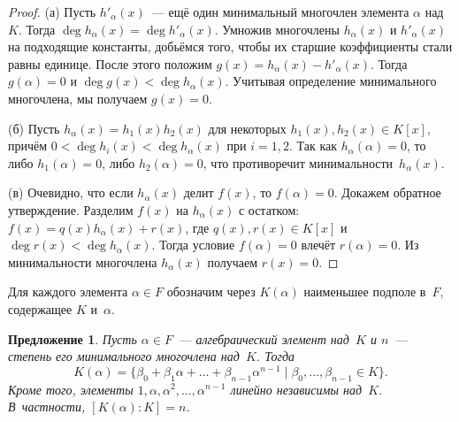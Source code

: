 \documentclass[a4paper,10pt]{amsart}
\newtheorem{proposition}{Предложение}
\theoremstyle{definition}
\theoremstyle{remark}
\begin{document}
\begin{proof}
	(а) Пусть $h'_\alpha(x)$~--- ещё один минимальный многочлен элемента
	$\alpha$ над~$K$. Тогда $\deg h_\alpha(x) = \deg h'_\alpha(x)$.
	Умножив многочлены $h_\alpha(x)$ и $h'_\alpha(x)$ на подходящие
	константы, добьёмся того, чтобы их старшие коэффициенты стали равны
	единице. После этого положим $g(x) = h_\alpha(x) - h'_\alpha(x)$.
	Тогда $g(\alpha) = 0$ и $\deg g(x) < \deg h_\alpha(x)$. Учитывая
	определение минимального многочлена, мы получаем $g(x) = 0$.
	
	(б) Пусть $h_\alpha(x) = h_1(x) h_2(x)$ для некоторых $h_1(x),
	h_2(x) \in K[x]$, причём $0 < \deg h_i(x) < \deg h_\alpha(x)$ при $i
	= 1,2$. Так как $h_\alpha(\alpha) = 0$, то либо $h_1(\alpha)=0$,
	либо $h_2(\alpha)=0$, что противоречит минимальности~$h_\alpha(x)$.
	
	(в) Очевидно, что если $h_\alpha(x)$ делит $f(x)$, то $f(\alpha) =
	0$. Докажем обратное утверждение. Разделим $f(x)$ на $h_\alpha(x)$ с
	остатком: $f(x) = q(x)h_\alpha(x) + r(x)$, где $q(x), r(x) \in K[x]$
	и $\deg r(x) < \deg h_\alpha(x)$. Тогда условие $f(\alpha)=0$ влечёт
	$r(\alpha) = 0$. Из минимальности многочлена $h_\alpha(x)$ получаем
	$r(x)=0$.
\end{proof}

Для каждого элемента $\alpha \in F$ обозначим через $K(\alpha)$
наименьшее подполе в~$F$, содержащее $K$ и~$\alpha$.

\begin{proposition}
	Пусть $\alpha \in F$~--- алгебраический элемент над~$K$ и $n$~---
	степень его минимального многочлена над~$K$. Тогда
	$$
	K(\alpha) = \{\beta_0 + \beta_1 \alpha + \ldots + \beta_{n-1}
	\alpha^{n-1} \mid \beta_0, \ldots, \beta_{n-1} \in K\}.
	$$
	Кроме того, элементы $1, \alpha, \alpha^2, \ldots, \alpha^{n-1}$
	линейно независимы над~$K$. В~частности, $[K(\alpha) : K] = n$.
\end{proposition}
\end{document}
